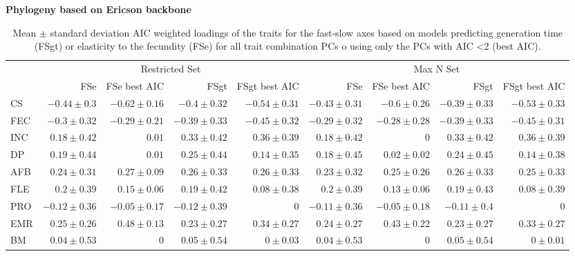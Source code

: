 \clearpage%
\begin{landscape}
\begin{table}
\center
\caption[LHT loadings of the FS axes]{
Mean $\pm$ standard deviation AIC weighted loadings of the traits for the
fast-slow axes based on models predicting generation time (FSgt) or elasticity
to the fecundity (FSe) for all trait combination PCs o using only the PCs
with AIC \textless{2} (best AIC).
}
\label{tab:tabApp2.2}
\begin{footnotesize}

\textbf{Phylogeny based on Ericson backbone}

\begin{tabular}{@{}l|rrrr|rrrr@{}}
\toprule
  & \multicolumn{4}{c|}{Restricted Set} & \multicolumn{4}{c}{Max N Set}\\
  & FSe & FSe best AIC & FSgt & FSgt best AIC & FSe & FSe best AIC & FSgt & FSgt best AIC\\
\midrule
CS & $-0.44 \pm 0.3$ & $-0.62 \pm 0.16$ & $-0.4 \pm 0.32$ & $-0.54 \pm 0.31$ & $-0.43 \pm 0.31$ & $-0.6 \pm 0.26$ & $-0.39 \pm 0.33$ & $-0.53 \pm 0.33$\\
FEC & $-0.3 \pm 0.32$ & $-0.29 \pm 0.21$ & $-0.39 \pm 0.33$ & $-0.45 \pm 0.32$ & $-0.29 \pm 0.32$ & $-0.28 \pm 0.28$ & $-0.39 \pm 0.33$ & $-0.45 \pm 0.31$\\
INC & $0.18 \pm 0.42$ & $0.01$ & $0.33 \pm 0.42$ & $0.36 \pm 0.39$ & $0.18 \pm 0.42$ & $0$ & $0.33 \pm 0.42$ & $0.36 \pm 0.39$\\
DP & $0.19 \pm 0.44$ & $0.01$ & $0.25 \pm 0.44$ & $0.14 \pm 0.35$ & $0.18 \pm 0.45$ & $0.02 \pm 0.02$ & $0.24 \pm 0.45$ & $0.14 \pm 0.38$\\
AFB & $0.24 \pm 0.31$ & $0.27 \pm 0.09$ & $0.26 \pm 0.33$ & $0.26 \pm 0.33$ & $0.23 \pm 0.32$ & $0.25 \pm 0.26$ & $0.26 \pm 0.33$ & $0.25 \pm 0.33$\\
FLE & $0.2 \pm 0.39$ & $0.15 \pm 0.06$ & $0.19 \pm 0.42$ & $0.08 \pm 0.38$ & $0.2 \pm 0.39$ & $0.13 \pm 0.06$ & $0.19 \pm 0.43$ & $0.08 \pm 0.39$\\
PRO & $-0.12 \pm 0.36$ & $-0.05 \pm 0.17$ & $-0.12 \pm 0.39$ & $0$ & $-0.11 \pm 0.36$ & $-0.05 \pm 0.18$ & $-0.11 \pm 0.4$ & $0$\\
EMR & $0.25 \pm 0.26$ & $0.48 \pm 0.13$ & $0.23 \pm 0.27$ & $0.34 \pm 0.27$ & $0.24 \pm 0.27$ & $0.43 \pm 0.22$ & $0.23 \pm 0.27$ & $0.33 \pm 0.27$\\
BM & $0.04 \pm 0.53$ & $0$ & $0.05 \pm 0.54$ & $0 \pm 0.03$ & $0.04 \pm 0.53$ & $0$ & $0.05 \pm 0.54$ & $0 \pm 0.01$\\

\end{tabular}
\end{footnotesize}
\end{table}
\end{landscape}

